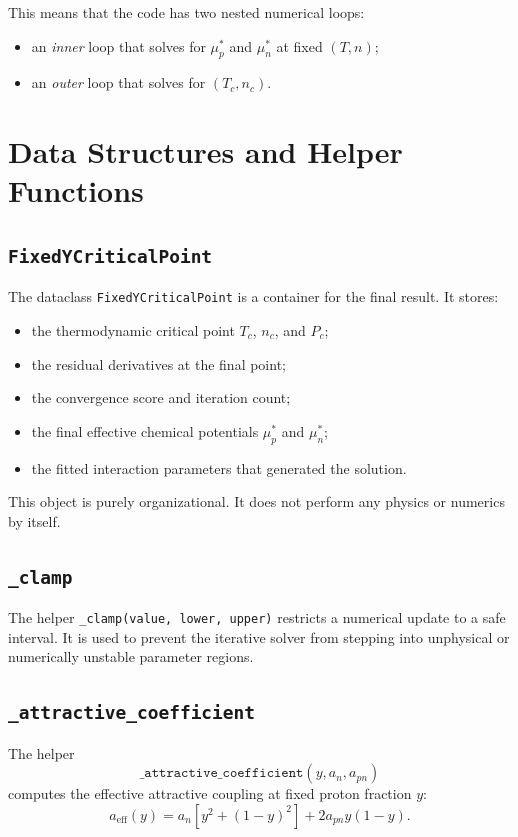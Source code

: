 \documentclass[11pt]{article}
\begin{document}
This means that the code has two nested numerical loops:

\begin{itemize}
\item an \emph{inner} loop that solves for $\mu_p^\ast$ and $\mu_n^\ast$ at
fixed $(T,n)$;
\item an \emph{outer} loop that solves for $(T_c,n_c)$.
\end{itemize}

\section{Data Structures and Helper Functions}

\subsection{\texttt{FixedYCriticalPoint}}

The dataclass \texttt{FixedYCriticalPoint} is a container for the final result.
It stores:
\begin{itemize}
\item the thermodynamic critical point $T_c$, $n_c$, and $P_c$;
\item the residual derivatives at the final point;
\item the convergence score and iteration count;
\item the final effective chemical potentials $\mu_p^\ast$ and $\mu_n^\ast$;
\item the fitted interaction parameters that generated the solution.
\end{itemize}

This object is purely organizational. It does not perform any physics or
numerics by itself.

\subsection{\texttt{\_clamp}}

The helper \texttt{\_clamp(value, lower, upper)} restricts a numerical update to
a safe interval. It is used to prevent the iterative solver from stepping into
unphysical or numerically unstable parameter regions.

\subsection{\texttt{\_attractive\_coefficient}}

The helper
\[
\texttt{\_attractive\_coefficient}(y, a_n, a_{pn})
\]
computes the effective attractive coupling at fixed proton fraction $y$:
\begin{equation}
a_{\text{eff}}(y)
= a_n\left[y^2 + (1-y)^2\right] + 2 a_{pn} y (1-y).
\end{equation}
\end{document}
